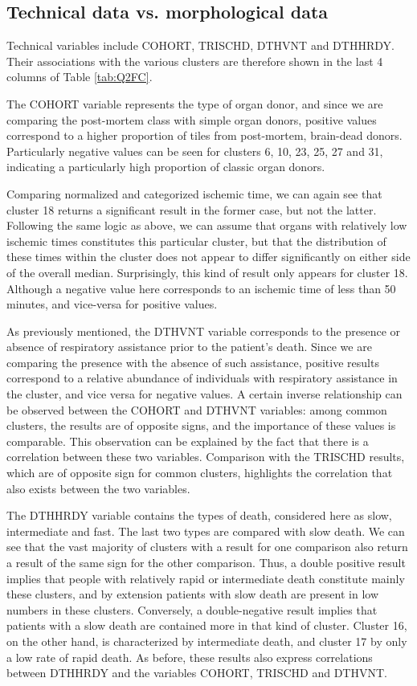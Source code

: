\documentclass[a4paper, 11pt]{article}
\begin{document}
\begin{multicols}{2}
\subsection{Technical data vs. morphological data}

Technical variables include COHORT, TRISCHD, DTHVNT and DTHHRDY. Their associations with the various clusters are therefore shown in the last 4 columns of Table \ref{tab:Q2FC}. 

The COHORT variable represents the type of organ donor, and since we are comparing the post-mortem class with simple organ donors, positive values correspond to a higher proportion of tiles from post-mortem, brain-dead donors. Particularly negative values can be seen for clusters 6, 10, 23, 25, 27 and 31, indicating a particularly high proportion of classic organ donors.

Comparing normalized and categorized ischemic time, we can again see that cluster 18 returns a significant result in the former case, but not the latter. Following the same logic as above, we can assume that organs with relatively low ischemic times constitutes this particular cluster, but that the distribution of these times within the cluster does not appear to differ significantly on either side of the overall median. Surprisingly, this kind of result only appears for cluster 18. Although a negative value here corresponds to an ischemic time of less than 50 minutes, and vice-versa for positive values.

As previously mentioned, the DTHVNT variable corresponds to the presence or absence of respiratory assistance prior to the patient's death. Since we are comparing the presence with the absence of such assistance, positive results correspond to a relative abundance of individuals with respiratory assistance in the cluster, and vice versa for negative values. A certain inverse relationship can be observed between the COHORT and DTHVNT variables: among common clusters, the results are of opposite signs, and the importance of these values is comparable. This observation can be explained by the fact that there is a correlation between these two variables. Comparison with the TRISCHD results, which are of opposite sign for common clusters, highlights the correlation that also exists between the two variables. 

The DTHHRDY variable contains the types of death, considered here as slow, intermediate and fast. The last two types are compared with slow death. We can see that the vast majority of clusters with a result for one comparison also return a result of the same sign for the other comparison. Thus, a double positive result implies that people with relatively rapid or intermediate death constitute mainly these clusters, and by extension patients with slow death are present in low numbers in these clusters. Conversely, a double-negative result implies that patients with a slow death are contained more in that kind of cluster. Cluster 16, on the other hand, is characterized by intermediate death, and cluster 17 by only a low rate of rapid death. As before, these results also express correlations between DTHHRDY and the variables COHORT, TRISCHD and DTHVNT. 


\end{multicols}
\end{document}
